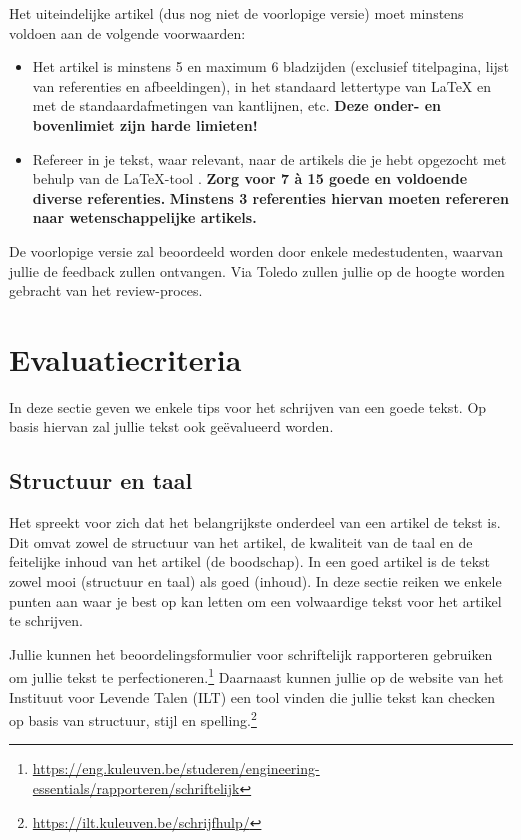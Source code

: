 \documentclass[a4paper]{article}
\begin{document}
Het uiteindelijke artikel (dus nog niet de voorlopige versie) moet minstens voldoen aan de volgende voorwaarden:
\begin{itemize}
	\item
		Het artikel is minstens 5 en maximum 6 bladzijden (exclusief titelpagina, lijst van referenties en afbeeldingen), in het standaard lettertype van \LaTeX{} en met de standaardafmetingen van kantlijnen, etc.
		\textbf{Deze onder- en bovenlimiet zijn harde limieten!}
	\item
		Refereer in je tekst, waar relevant, naar de artikels die je hebt opgezocht met behulp van de \LaTeX{}-tool \BibTeX{}.
		\textbf{Zorg voor 7 \`a 15 goede en voldoende diverse referenties.}
		\textbf{Minstens 3 referenties hiervan moeten refereren naar wetenschappelijke artikels.}
\end{itemize}

De voorlopige versie zal beoordeeld worden door enkele medestudenten, waarvan jullie de feedback zullen ontvangen.
Via Toledo zullen jullie op de hoogte worden gebracht van het review-proces.


\section{Evaluatiecriteria}

In deze sectie geven we enkele tips voor het schrijven van een goede tekst.
Op basis hiervan zal jullie tekst ook ge\"evalueerd worden.


\subsection{Structuur en taal}

Het spreekt voor zich dat het belangrijkste onderdeel van een artikel de tekst is.
Dit omvat zowel de structuur van het artikel, de kwaliteit van de taal en de feitelijke inhoud van het artikel (de boodschap).
In een goed artikel is de tekst zowel mooi (structuur en taal) als goed (inhoud).
In deze sectie reiken we enkele punten aan waar je best op kan letten om een volwaardige tekst voor het artikel te schrijven.

Jullie kunnen het beoordelingsformulier voor schriftelijk rapporteren gebruiken om jullie tekst te perfectioneren.\footnote{\url{https://eng.kuleuven.be/studeren/engineering-essentials/rapporteren/schriftelijk}}
Daarnaast kunnen jullie op de website van het Instituut voor Levende Talen (ILT) een tool vinden die jullie tekst kan checken op basis van structuur, stijl en spelling.\footnote{\url{https://ilt.kuleuven.be/schrijfhulp/}}
\end{document}
